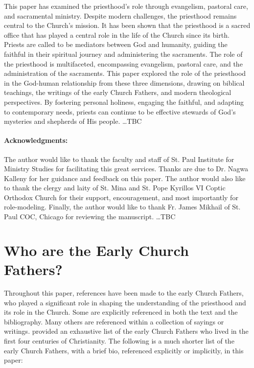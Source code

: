 \documentclass[12pt, doc]{apa7}   	%
\begin{document}
This paper has examined the priesthood’s role through evangelism, pastoral care, and sacramental ministry. Despite modern challenges, the priesthood remains central to the Church’s mission. It has been shown that the priesthood is a sacred office that has played a central role in the life of the Church since its birth. Priests are called to be mediators between God and humanity, guiding the faithful in their spiritual journey and administering the sacraments. The role of the priesthood is multifaceted, encompassing evangelism, pastoral care, and the administration of the sacraments. This paper explored the role of the priesthood in the God-human relationship from these three dimensions, drawing on biblical teachings, the writings of the early Church Fathers, and modern theological perspectives. By fostering personal holiness, engaging the faithful, and adapting to contemporary needs, priests can continue to be effective stewards of God’s mysteries and shepherds of His people. \dots TBC

\vskip 0.5cm
\paragraph{Acknowledgments:} The author would like to thank the faculty and staff of St. Paul Institute for Ministry Studies for facilitating this great services.  Thanks are due to Dr. Nagwa Kalleny for her guidance and feedback on this paper.  The author would also like to thank the clergy and laity of St. Mina and St. Pope Kyrillos VI Coptic Orthodox Church for their support, encouragement, and most importantly for role-modeling.  Finally, the author would like to thank Fr. James Mikhail of St. Paul COC, Chicago for reviewing the manuscript.  \dots TBC 

\pagebreak
\appendix{}
\section{Who are the Early Church Fathers?}\label{early_fathers}
Throughout this paper, references have been made to the early Church Fathers, who played a significant role in shaping the understanding of the priesthood and its role in the Church.  Some are explicitly referenced in both the text and the bibliography.  Many others are referenced within a collection of sayings or writings. \citet{early_church_akin} provided an exhaustive list of the early Church Fathers who lived in the first four centuries of Christianity.  The following is a much shorter list of the early Church Fathers, with a brief bio, referenced explicitly or implicitly, in this paper:
\end{document}
